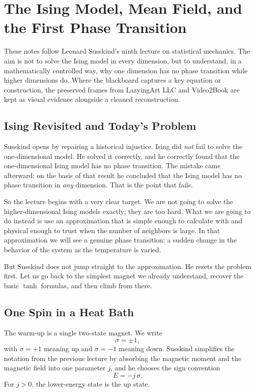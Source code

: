 \chapter{The Ising Model, Mean Field, and the First Phase Transition}

These notes follow Leonard Susskind's ninth lecture on statistical mechanics. The aim is not to solve the Ising model in every dimension, but to understand, in a mathematically controlled way, why one dimension has no phase transition while higher dimensions do. Where the blackboard captures a key equation or construction, the preserved frames from LazyingArt LLC and Video2Book are kept as visual evidence alongside a cleaned reconstruction.

\section{Ising Revisited and Today's Problem}

Susskind opens by repairing a historical injustice. Ising did \emph{not} fail to solve the one-dimensional model. He solved it correctly, and he correctly found that the one-dimensional Ising model has no phase transition. The mistake came afterward: on the basis of that result he concluded that the Ising model has no phase transition in \emph{any} dimension. That is the point that fails.

So the lecture begins with a very clear target. We are not going to solve the higher-dimensional Ising models exactly; they are too hard. What we are going to do instead is use an approximation that is simple enough to calculate with and physical enough to trust when the number of neighbors is large. In that approximation we will see a genuine phase transition: a sudden change in the behavior of the system as the temperature is varied.

But Susskind does not jump straight to the approximation. He resets the problem first. Let us go back to the simplest magnet we already understand, recover the basic \(\tanh\) formulas, and then climb from there.

\section{One Spin in a Heat Bath}

The warm-up is a single two-state magnet. We write
\begin{equation}
\sigma=\pm 1,
\end{equation}
with \(\sigma=+1\) meaning up and \(\sigma=-1\) meaning down. Susskind simplifies the notation from the previous lecture by absorbing the magnetic moment and the magnetic field into one parameter \(j\), and he chooses the sign convention
\begin{equation}
E=-j\,\sigma.
\end{equation}
For \(j>0\), the lower-energy state is the up state.

